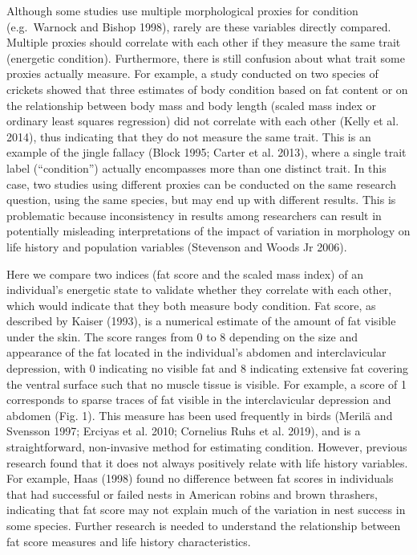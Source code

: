\documentclass[
]{article}
\begin{document}
Although some studies use multiple morphological proxies for condition
(e.g.~Warnock and Bishop 1998), rarely are these variables directly
compared. Multiple proxies should correlate with each other if they
measure the same trait (energetic condition). Furthermore, there is
still confusion about what trait some proxies actually measure. For
example, a study conducted on two species of crickets showed that three
estimates of body condition based on fat content or on the relationship
between body mass and body length (scaled mass index or ordinary least
squares regression) did not correlate with each other (Kelly et al.
2014), thus indicating that they do not measure the same trait. This is
an example of the jingle fallacy (Block 1995; Carter et al. 2013), where
a single trait label (``condition'') actually encompasses more than one
distinct trait. In this case, two studies using different proxies can be
conducted on the same research question, using the same species, but may
end up with different results. This is problematic because inconsistency
in results among researchers can result in potentially misleading
interpretations of the impact of variation in morphology on life history
and population variables (Stevenson and Woods Jr 2006).

Here we compare two indices (fat score and the scaled mass index) of an
individual's energetic state to validate whether they correlate with
each other, which would indicate that they both measure body condition.
Fat score, as described by Kaiser (1993), is a numerical estimate of the
amount of fat visible under the skin. The score ranges from 0 to 8
depending on the size and appearance of the fat located in the
individual's abdomen and interclavicular depression, with 0 indicating
no visible fat and 8 indicating extensive fat covering the ventral
surface such that no muscle tissue is visible. For example, a score of 1
corresponds to sparse traces of fat visible in the interclavicular
depression and abdomen (Fig. 1). This measure has been used frequently
in birds (Merilä and Svensson 1997; Erciyas et al. 2010; Cornelius Ruhs
et al. 2019), and is a straightforward, non-invasive method for
estimating condition. However, previous research found that it does not
always positively relate with life history variables. For example, Haas
(1998) found no difference between fat scores in individuals that had
successful or failed nests in American robins and brown thrashers,
indicating that fat score may not explain much of the variation in nest
success in some species. Further research is needed to understand the
relationship between fat score measures and life history
characteristics.
\end{document}
